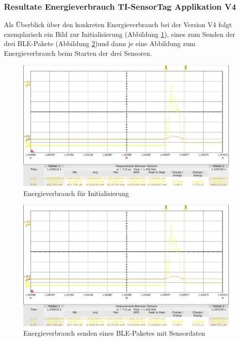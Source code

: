 \subsubsection{Resultate Energieverbrauch TI-SensorTag Applikation V4}
\label{energie senosortag} 

Als Überblick über den konkreten Energieverbrauch bei der Version V4 folgt exemplarisch ein Bild zur Initialisierung (Abbildung \ref{energie_init}), eines zum Senden der drei BLE-Pakete (Abbildung \ref{energie_senden})und dann je eine Abbildung zum Energieverbrauch beim Starten der drei Sensoren.

\begin{figure}[ht]
  \includegraphics[width=1.0\textwidth]{3Vorgehen/imag/Drucksensor.png}
  \caption{Energieverbrauch für Initialisierung}
  \label{energie_init}
\end{figure}

\begin{figure}[ht]
  \includegraphics[width=1.0\textwidth]{3Vorgehen/imag/Drucksensor.png}
  \caption{Energieverbrauch senden eines BLE-Paketes mit Sensordaten}
  \label{energie_senden}
\end{figure}


